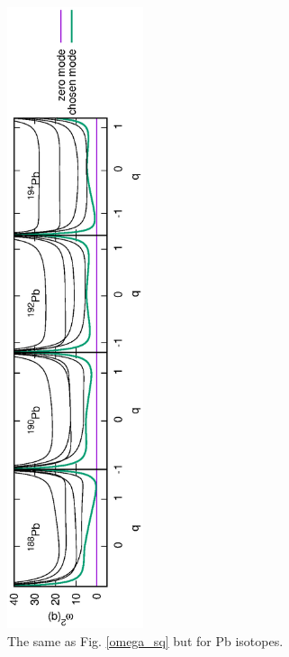 \documentclass[%
superscriptaddress,
showpacs,
nofootinbib,
amsmath,amssymb,
aps,
prc,
twocolumn,
floatfix ]%
{revtex4-1}
\begin{document}
\begin{figure}[t]
 \begin{center}
  \includegraphics[width=40mm,angle=-90]{Pbomega_sq.eps}
 \end{center}
	\caption{The same as Fig. \ref{omega_sq} but for Pb isotopes.
}
 \label{Pb_omega_sq}
\end{figure}
\end{document}

